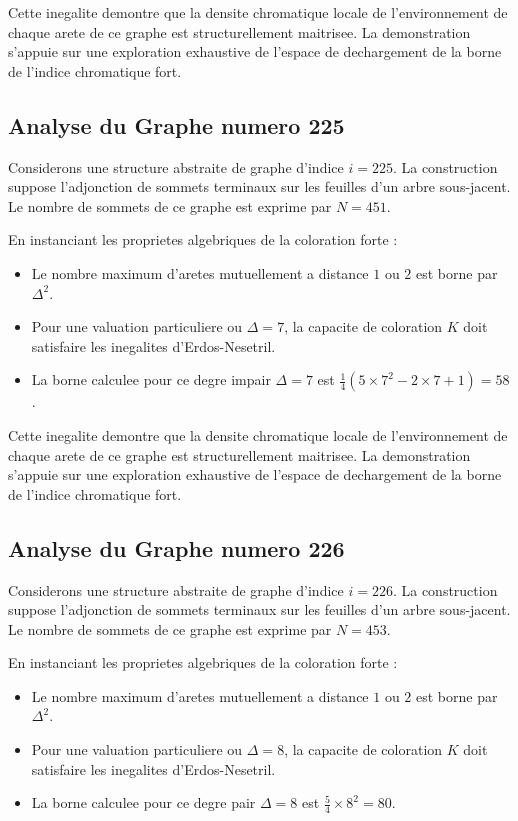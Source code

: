 \documentclass[11pt,a4paper]{article}
\begin{document}
Cette inegalite demontre que la densite chromatique locale de l'environnement de chaque arete de ce graphe est structurellement maitrisee. La demonstration s'appuie sur une exploration exhaustive de l'espace de dechargement de la borne de l'indice chromatique fort.

\subsection{Analyse du Graphe numero 225}
Considerons une structure abstraite de graphe d'indice $i = 225$. La construction suppose l'adjonction de sommets terminaux sur les feuilles d'un arbre sous-jacent. Le nombre de sommets de ce graphe est exprime par $N = 451$.

En instanciant les proprietes algebriques de la coloration forte :
\begin{itemize}
\item Le nombre maximum d'aretes mutuellement a distance $1$ ou $2$ est borne par $\Delta^2$.
\item Pour une valuation particuliere ou $\Delta = 7$, la capacite de coloration $K$ doit satisfaire les inegalites d'Erdos-Nesetril.
\item La borne calculee pour ce degre impair $\Delta = 7$ est $\frac{1}{4}(5 \times 7^2 - 2 \times 7 + 1) = 58$.
\end{itemize}

Cette inegalite demontre que la densite chromatique locale de l'environnement de chaque arete de ce graphe est structurellement maitrisee. La demonstration s'appuie sur une exploration exhaustive de l'espace de dechargement de la borne de l'indice chromatique fort.

\subsection{Analyse du Graphe numero 226}
Considerons une structure abstraite de graphe d'indice $i = 226$. La construction suppose l'adjonction de sommets terminaux sur les feuilles d'un arbre sous-jacent. Le nombre de sommets de ce graphe est exprime par $N = 453$.

En instanciant les proprietes algebriques de la coloration forte :
\begin{itemize}
\item Le nombre maximum d'aretes mutuellement a distance $1$ ou $2$ est borne par $\Delta^2$.
\item Pour une valuation particuliere ou $\Delta = 8$, la capacite de coloration $K$ doit satisfaire les inegalites d'Erdos-Nesetril.
\item La borne calculee pour ce degre pair $\Delta = 8$ est $\frac{5}{4} \times 8^2 = 80$.
\end{itemize}
\end{document}

